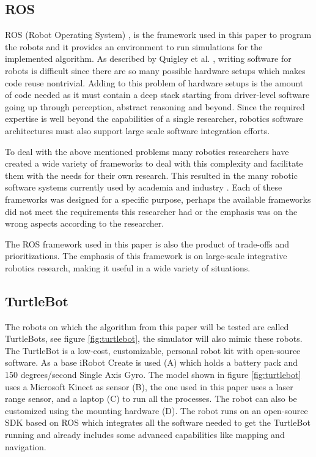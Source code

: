 \documentclass{ba-kecs}
\begin{document}
\subsection{ROS}
ROS (Robot Operating System) \cite{Quigley}, is the framework used in this paper to program the robots and it provides an environment to run simulations for the implemented algorithm. As described by Quigley et al. \cite{Quigley}, writing software for robots is difficult since there are so many possible hardware setups which makes code reuse nontrivial. Adding to this problem of hardware setups is the amount of code needed as it must contain a deep stack starting from driver-level software going up through perception, abstract reasoning and beyond. Since the required expertise is well beyond the capabilities of a single researcher, robotics software architectures must also support large scale software integration efforts.

To deal with the above mentioned problems many robotics researchers have created a wide variety of frameworks to deal with this complexity and facilitate them with the needs for their own research. This resulted in the many robotic software systems currently used by academia and industry \cite{Kramer}. Each of these frameworks was designed for a specific purpose, perhaps the available frameworks did not meet the requirements this researcher had or the emphasis was on the wrong aspects according to the researcher.

The ROS framework used in this paper is also the product of trade-offs and prioritizations. The emphasis of this framework is on large-scale integrative robotics research, making it useful in a wide variety of situations.

\subsection{TurtleBot}
The robots on which the algorithm from this paper will be tested are called TurtleBots, see figure \ref{fig:turtlebot}, the simulator will also mimic these robots. The TurtleBot is a low-cost, customizable, personal robot kit with open-source software. As a base iRobot Create is used (A) which holds a battery pack and 150 degrees/second Single Axis Gyro. The model shown in figure  \ref{fig:turtlebot} uses a Microsoft Kinect as sensor (B), the one used in this paper uses a laser range sensor, and a laptop (C) to run all the processes. The robot can also be customized using the mounting hardware (D). The robot runs on an open-source SDK based on ROS which integrates all the software needed to get the TurtleBot running and already includes some advanced capabilities like mapping and navigation.
\end{document}
